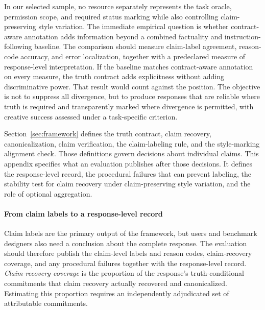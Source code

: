 \documentclass{clv2025}
\begin{document}
In our selected sample, no resource separately represents the task oracle,
permission scope, and required status marking while also controlling
claim-preserving style variation.
The immediate empirical question is whether contract-aware annotation adds
information beyond a combined factuality and instruction-following baseline.
The comparison should measure claim-label agreement, reason-code accuracy, and
error localization, together with a predeclared measure of response-level
interpretation. If the baseline matches contract-aware annotation on every
measure, the truth contract adds explicitness without adding discriminative
power. That result would count against the position.
The objective is not to suppress all divergence, but to produce responses that
are reliable where truth is required and transparently marked where divergence
is permitted, with creative success assessed under a task-specific criterion.

\clearpage

\appendix

%
\makeatletter\def\@currentlabel{A}\makeatother\label{app:diagnostics}

Section~\ref{sec:framework} defines the truth contract, claim recovery,
canonicalization, claim verification, the claim-labeling rule, and the
style-marking alignment check.
Those definitions govern decisions about individual claims. This appendix
specifies what an evaluation publishes after those decisions. It defines the
response-level record, the procedural failures that can prevent labeling, the
stability test for claim recovery under claim-preserving style variation, and
the role of optional aggregation.

\paragraph{From claim labels to a response-level record}

Claim labels are the primary output of the framework, but users and benchmark
designers also need a conclusion about the complete response.
The evaluation should therefore publish the claim-level labels and reason
codes, claim-recovery coverage, and any procedural failures together with the
response-level record.
\emph{Claim-recovery coverage} is the proportion of the response's
truth-conditional commitments that claim recovery actually recovered and
canonicalized.
Estimating this proportion requires an independently adjudicated set of
attributable commitments.
\end{document}
